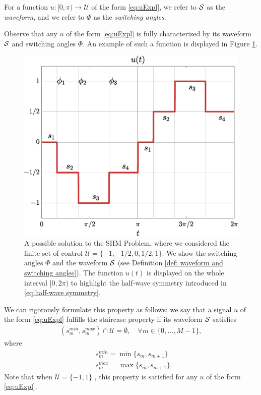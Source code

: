 \documentclass[twocolumn]{autart}    %
\begin{document}
\begin{definition}\label{def: waveform and switching angles}
For a function $u: [0,\pi) \to \mathcal{U}$ of the form \eqref{eq:uExpl}, we refer to $\mathcal{S}$ as the \emph{waveform}, and we refer to $\Phi$ as the \emph{switching angles}.
\end{definition}

Observe that any $u$ of the form \eqref{eq:uExpl} is fully characterized by its waveform $\mathcal{S}$ and switching angles $\Phi$. An example of such a function is displayed in Figure \ref{fig:exampleSHE}. 

\begin{figure}[h]
	\centering
	\includegraphics[scale=0.35]{img/fig01.eps} 
	\caption{A possible solution to the SHM Problem, where we considered the finite set of control $\mathcal{U} = \{-1, -1/2, 0, 1/2, 1\}$. We show the switching angles $\Phi$ and the waveform $\mathcal{S}$ (see Definition \ref{def: waveform and switching angles}). The function $u(t)$ is displayed on the whole interval $[0,2\pi)$ to highlight the half-wave symmetry introduced in \eqref{eq:half-wave symmetry}.}
	\label{fig:exampleSHE}
\end{figure}

We can rigorously formulate this property as follows: we say that a signal $u$ of the form \eqref{eq:uExpl} fulfills the staircase property if its waveform $\mathcal{S}$ satisfies
\JOStart
\begin{gather}\label{eq:staircase prop}
	(s_m^{min},s_{m}^{max}) \cap \mathcal{U} = \emptyset, \quad \forall m\in \{ 0, \ldots, M-1 \},
\end{gather}
where 
\begin{align*}
	&s^{min}_m = \min\{s_m,s_{m+1}\} 
	\\[5pt]
	&s^{max}_m = \max\{s_m,s_{m+1}\}.
\end{align*}
\JOEnd
%
Note that when $\mathcal{U} = \{-1,1\}$ , this property is satisfied for any $u$ of the form \eqref{eq:uExpl}.
\end{document}
